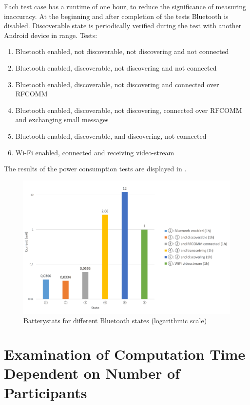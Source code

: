   

Each test case has a runtime of one hour, to reduce the significance of measuring inaccuracy. At the beginning and after completion of the tests Bluetooth is disabled. Discoverable state is periodically verified during the test with another Android device in range. Tests:

\begin{enumerate}
	\item Bluetooth enabled, not discoverable, not discovering and not connected
	\item Bluetooth enabled, discoverable, not discovering and not connected
	\item Bluetooth enabled, discoverable, not discovering and connected over \gls{RFCOMM}
	\item Bluetooth enabled, discoverable, not discovering, connected over \gls{RFCOMM} and exchanging small messages
	\item Bluetooth enabled, discoverable, and discovering, not connected
	\item Wi-Fi enabled, connected and receiving video-stream
\end{enumerate}

The results of the power consumption tests are displayed in .

\begin{figure}[!htbp] %
	\caption{Batterystats for different Bluetooth states (logarithmic scale) } \label{figure:Batterystats}
	\includegraphics[scale=1.0]{figures/eval_current_measurements.png}
\end{figure}

\section{Examination of Computation Time Dependent on Number of Participants} \label{Examination of Computation Time Dependent on Number of Participants}

